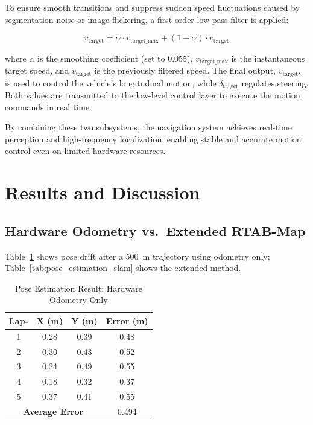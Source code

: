 \documentclass[conference, a4paper]{IEEEtran}[2015/08/26]
\begin{document}
\par
To ensure smooth transitions and suppress sudden speed fluctuations caused by segmentation noise or image flickering, a first-order low-pass filter is applied:

\begin{equation}
	v_{\text{target}} = \alpha \cdot v_{\text{target\_max}} + (1 - \alpha) \cdot v_{\text{target}}
	\label{eq:low_pass_filter}
\end{equation}

where $\alpha$ is the smoothing coefficient (set to 0.055), $v_{\text{target\_max}}$ is the instantaneous target speed, and $v_{\text{target}}$ is the previously filtered speed. The final output, $v_{\text{target}}$, is used to control the vehicle’s longitudinal motion, while $\delta_{\text{target}}$ regulates steering. Both values are transmitted to the low-level control layer to execute the motion commands in real time.

\par
By combining these two subsystems, the navigation system achieves real-time perception and high-frequency localization, enabling stable and accurate motion control even on limited hardware resources.


\section{Results and Discussion}
\subsection{Hardware Odometry vs.\ Extended RTAB-Map}
Table~\ref{tab:pose_estimation} shows pose drift after a 500~m trajectory using odometry only; Table~\ref{tab:pose_estimation_slam} shows the extended method.

\begin{table}[H]
	\centering
	\caption{Pose Estimation Result: Hardware Odometry Only}
	\label{tab:pose_estimation}
	\begin{tabular}{|c|c|c|c|}
		\hline
		\textbf{Lap-} & \textbf{X (m)} & \textbf{Y (m)} & \textbf{Error (m)} \\ \hline
		1 & 0.28 & 0.39 & 0.48 \\ \hline
		2 & 0.30 & 0.43 & 0.52 \\ \hline
		3 & 0.24 & 0.49 & 0.55 \\ \hline
		4 & 0.18 & 0.32 & 0.37 \\ \hline
		5 & 0.37 & 0.41 & 0.55 \\ \hline
		\multicolumn{3}{|c|}{\textbf{Average Error}} & 0.494 \\ \hline
	\end{tabular}
\end{table}
\end{document}
